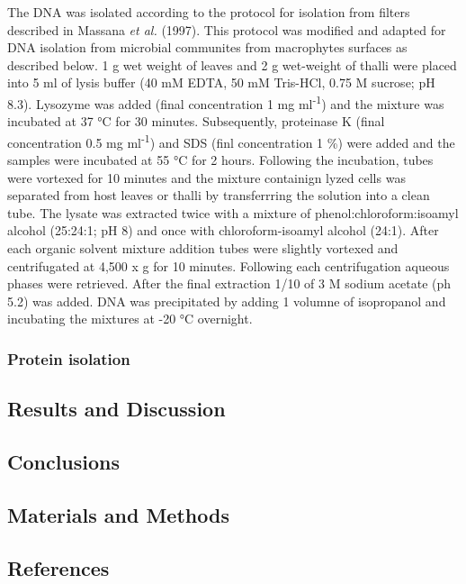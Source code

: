 \documentclass[12pt,]{article}
\begin{document}
The DNA was isolated according to the protocol for isolation from
filters described in Massana \emph{et al.} (1997). This protocol was
modified and adapted for DNA isolation from microbial communites from
macrophytes surfaces as described below. 1 g wet weight of leaves and 2
g wet-weight of thalli were placed into 5 ml of lysis buffer (40 mM
EDTA, 50 mM Tris-HCl, 0.75 M sucrose; pH 8.3). Lysozyme was added (final
concentration 1 mg ml\textsuperscript{-1}) and the mixture was incubated
at 37 °C for 30 minutes. Subsequently, proteinase K (final concentration
0.5 mg ml\textsuperscript{-1}) and SDS (finl concentration 1 \%) were
added and the samples were incubated at 55 °C for 2 hours. Following the
incubation, tubes were vortexed for 10 minutes and the mixture
containign lyzed cells was separated from host leaves or thalli by
transferrring the solution into a clean tube. The lysate was extracted
twice with a mixture of phenol:chloroform:isoamyl alcohol (25:24:1; pH
8) and once with chloroform-isoamyl alcohol (24:1). After each organic
solvent mixture addition tubes were slightly vortexed and centrifugated
at 4,500 x g for 10 minutes. Following each centrifugation aqueous
phases were retrieved. After the final extraction 1/10 of 3 M sodium
acetate (ph 5.2) was added. DNA was precipitated by adding 1 volumne of
isopropanol and incubating the mixtures at -20 °C overnight.

\subsubsection{Protein isolation}\label{protein-isolation}

\subsection{Results and Discussion}\label{results-and-discussion}

\subsection{Conclusions}\label{conclusions}

\subsection{Materials and Methods}\label{materials-and-methods-1}

\newpage

\newpage

\subsection*{References}\label{references}
\end{document}
